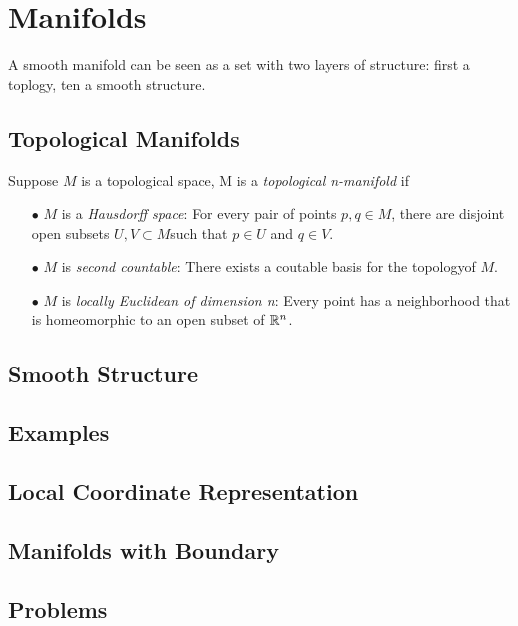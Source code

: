 \chapter{Manifolds}
A smooth manifold can be seen as a set with two layers of structure: first a toplogy,
ten a smooth structure.

\section{Topological Manifolds}

\begin{definition} 
Suppose $M$ is a topological space, M is a \emph{topological n-manifold} if
\begin{enumerate}
\item[$\bullet$] $M$ is a \emph{Hausdorff space}: For every pair of points $p,q \in M$, 
there are disjoint open subsets $U,V\subset M$such that $p\in U$ and $q\in V$.
\item[$\bullet$] $M$ is \emph{second countable}: There exists a coutable basis for 
the topologyof $M$.
\item[$\bullet$] $M$ is \emph{locally Euclidean of dimension n}: Every point has a 
neighborhood that is homeomorphic to an open subset of $\mathbb{R}^n$. 
\end{enumerate}
\end{definition}

\section{Smooth Structure}
\section{Examples}
\section{Local Coordinate Representation}
\section{Manifolds with Boundary}
\section{Problems}